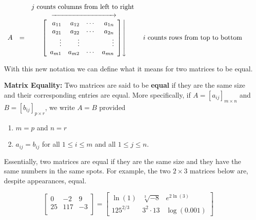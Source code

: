 \documentclass{ximera}
\begin{document}


\[ \begin{array}{ccccc} 
  &  &  \text{$j$ counts columns from left to right } &  & \\  &  & \xrightarrow{\hspace{1.25in}} & & \\
A & = & \left. \left[ \begin{array}{rrrr} a_{11} & a_{12} & \cdots & a_{1n} \\ a_{21} & a_{22} & \cdots & a_{2n} \\ \vdots & \vdots  & & \vdots \\ a_{m1} & a_{m2} & \cdots & a_{mn} \end{array}  \right] \right\downarrow & \text{$i$ counts rows from top to bottom} \end{array} \] 

With this new notation we can define what it means for two matrices to be equal.


\begin{definition} \label{matrixequality} \textbf{Matrix Equality:}  Two matrices are said to be  \textbf{equal} if they are the same size and their corresponding entries are equal.  More specifically, if $A =\left[a_{ij}\right]_{m \times n}$ and $B =\left[b_{ij}\right]_{p \times r}$, we write $A=B$ provided 

\begin{enumerate}

\item  $m=p$ and $n=r$

\item  $a_{ij} = b_{ij}$ for all $1 \leq i \leq m$ and all $1 \leq j \leq n$.

\end{enumerate}

\end{definition}


\smallskip

Essentially, two matrices are equal if they are the same size and they have the same numbers in the same spots.  For example, the two $2 \times 3$ matrices below are, despite appearances, equal.

\[ \left[ \begin{array}{rrr} 0 & -2 & 9 \\ 25 & 117 & -3 \\ \end{array} \right] =  \left[ \begin{array}{rrr} \ln(1) & \sqrt[3]{-8} & e^{2\ln(3)} \\ 125^{2/3} &  3^{2} \cdot 13 & \log(0.001)  \end{array} \right]\]
\end{document}
